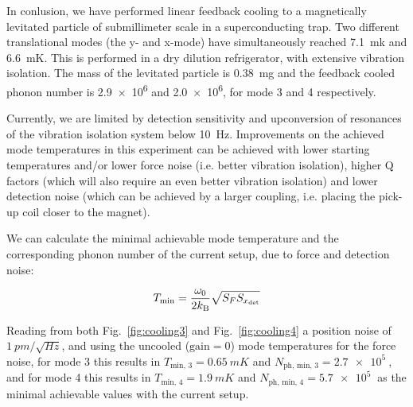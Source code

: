 \label{sec:conclusion}
In conlusion, we have performed linear feedback cooling to a magnetically levitated particle of submillimeter scale in a superconducting trap. Two different translational modes (the y- and x-mode) have simultaneously reached \SI{7.1}{mk} and \SI{6.6}{mK}. This is performed in a dry dilution refrigerator, with extensive vibration isolation. The mass of the levitated particle is \SI{0.38}{mg} and the feedback cooled phonon number is \SI{2.9e6}{} and \SI{2.0e6}{}, for mode 3 and 4 respectively.

Currently, we are limited by detection sensitivity and upconversion of resonances of the vibration isolation system below \SI{10}{Hz}. Improvements on the achieved mode temperatures in this experiment can be achieved with lower starting temperatures and/or lower force noise (i.e.  better vibration isolation), higher Q factors (which will also require an even better vibration isolation) and lower detection noise (which can be achieved by a larger coupling, i.e. placing the pick-up coil closer to the magnet). 

We can calculate the minimal achievable mode temperature and the corresponding phonon number of the current setup, due to force and detection noise:

\begin{equation}
    T_\text{min} = \frac{\omega_0}{2 k_\text{B}} \sqrt{ S_F S_{x_\text{det}}}
\end{equation}

Reading from both Fig.~\ref{fig:cooling3} and Fig.~\ref{fig:cooling4} a position noise of $\SI{1}{pm/\sqrt{Hz}}$, and using the uncooled ($\text{gain} =0$) mode temperatures for the force noise, for mode 3 this results in $T_\text{min, 3} = \SI{0.65}{mK}$ and $N_\text{ph, min, 3} = \SI{2.7e5}{}$, and for mode 4 this results in $T_\text{min, 4} = \SI{1.9}{mK}$ and $N_\text{ph, min, 4} = \SI{5.7e5}{}$ as the minimal achievable values with the current setup. 

